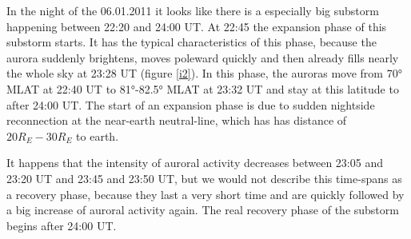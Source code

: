 \documentclass[10pt,a4paper]{article}
\begin{document}
 In the night of the 06.01.2011 it looks like there is a especially big substorm happening between 22:20 and 24:00 UT. At 22:45 the expansion phase of this substorm starts. It has the typical characteristics of this phase, because the aurora suddenly brightens, moves poleward quickly and then already fills nearly the whole sky at 23:28 UT (figure \ref{i2}). In this phase, the auroras move from 70° MLAT at 22:40 UT to 81°-82.5° MLAT at 23:32 UT and stay at this latitude to after 24:00 UT. The start of an expansion phase is due to sudden nightside reconnection at the near-earth neutral-line, which has has distance of $20 R_E-30 R_E$ to earth.
 
 It happens that the intensity of auroral activity decreases between 23:05 and 23:20 UT and 23:45 and 23:50 UT, but we would not describe this time-spans as a recovery phase, because they last a very short time and are quickly followed by a big increase of auroral activity again. The real recovery phase of the substorm begins after 24:00 UT.   
\end{document}
